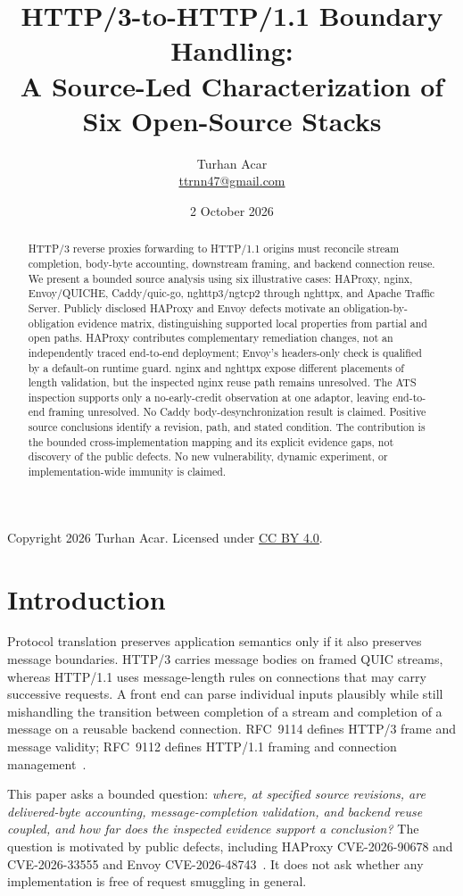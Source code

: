 \documentclass[11pt,letterpaper]{article}
\title{HTTP/3-to-HTTP/1.1 Boundary Handling:\\A Source-Led Characterization of Six Open-Source Stacks}
\author{Turhan Acar\\\small\href{mailto:ttrnn47@gmail.com}{ttrnn47@gmail.com}}
\date{2 October 2026}
\begin{document}
\maketitle
\begin{abstract}
HTTP/3 reverse proxies forwarding to HTTP/1.1 origins must reconcile stream completion, body-byte accounting, downstream framing, and backend connection reuse. We present a bounded source analysis using six illustrative cases: HAProxy, nginx, Envoy/QUICHE, Caddy/quic-go, nghttp3/ngtcp2 through nghttpx, and Apache Traffic Server. Publicly disclosed HAProxy and Envoy defects motivate an obligation-by-obligation evidence matrix, distinguishing supported local properties from partial and open paths. HAProxy contributes complementary remediation changes, not an independently traced end-to-end deployment; Envoy's headers-only check is qualified by a default-on runtime guard. nginx and nghttpx expose different placements of length validation, but the inspected nginx reuse path remains unresolved. The ATS inspection supports only a no-early-credit observation at one adaptor, leaving end-to-end framing unresolved. No Caddy body-desynchronization result is claimed. Positive source conclusions identify a revision, path, and stated condition. The contribution is the bounded cross-implementation mapping and its explicit evidence gaps, not discovery of the public defects. No new vulnerability, dynamic experiment, or implementation-wide immunity is claimed.
\end{abstract}
\vspace{0.3em}
{\footnotesize Copyright 2026 Turhan Acar. Licensed under \href{https://creativecommons.org/licenses/by/4.0/}{CC BY 4.0}.}

\section{Introduction}
Protocol translation preserves application semantics only if it also preserves message boundaries. HTTP/3 carries message bodies on framed QUIC streams, whereas HTTP/1.1 uses message-length rules on connections that may carry successive requests. A front end can parse individual inputs plausibly while still mishandling the transition between completion of a stream and completion of a message on a reusable backend connection. RFC~9114 defines HTTP/3 frame and message validity; RFC~9112 defines HTTP/1.1 framing and connection management~\cite{rfc9114,rfc9112}.

This paper asks a bounded question: \emph{where, at specified source revisions, are delivered-byte accounting, message-completion validation, and backend reuse coupled, and how far does the inspected evidence support a conclusion?} The question is motivated by public defects, including HAProxy CVE-2026-90678 and CVE-2026-33555 and Envoy CVE-2026-48743~\cite{hap90678,hap33555,envoyadvisory}. It does not ask whether any implementation is free of request smuggling in general.
\end{document}
